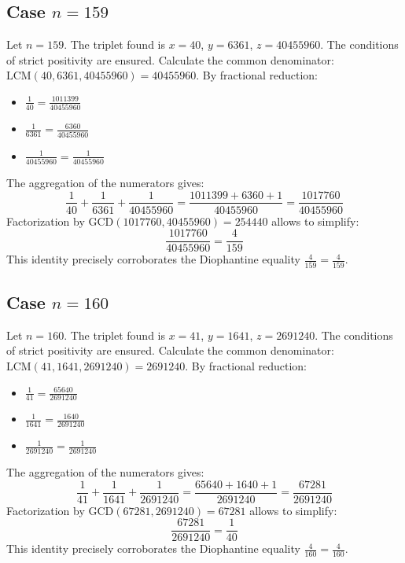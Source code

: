 \documentclass[11pt,a4paper]{article}
\begin{document}
\subsection{Case $n = 159$}
Let $n = 159$. The triplet found is $x = 40$, $y = 6361$, $z = 40455960$.
The conditions of strict positivity are ensured.
Calculate the common denominator: $\text{LCM}(40, 6361, 40455960) = 40455960$.
By fractional reduction:
\begin{itemize}
    \item $\frac{1}{40} = \frac{1011399}{40455960}$
    \item $\frac{1}{6361} = \frac{6360}{40455960}$
    \item $\frac{1}{40455960} = \frac{1}{40455960}$
\end{itemize}
The aggregation of the numerators gives:
$$ \frac{1}{40} + \frac{1}{6361} + \frac{1}{40455960} = \frac{1011399 + 6360 + 1}{40455960} = \frac{1017760}{40455960} $$
Factorization by $\text{GCD}(1017760, 40455960) = 254440$ allows to simplify:
$$ \frac{1017760}{40455960} = \frac{4}{159} $$
This identity precisely corroborates the Diophantine equality $\frac{4}{159} = \frac{4}{159}$.

\subsection{Case $n = 160$}
Let $n = 160$. The triplet found is $x = 41$, $y = 1641$, $z = 2691240$.
The conditions of strict positivity are ensured.
Calculate the common denominator: $\text{LCM}(41, 1641, 2691240) = 2691240$.
By fractional reduction:
\begin{itemize}
    \item $\frac{1}{41} = \frac{65640}{2691240}$
    \item $\frac{1}{1641} = \frac{1640}{2691240}$
    \item $\frac{1}{2691240} = \frac{1}{2691240}$
\end{itemize}
The aggregation of the numerators gives:
$$ \frac{1}{41} + \frac{1}{1641} + \frac{1}{2691240} = \frac{65640 + 1640 + 1}{2691240} = \frac{67281}{2691240} $$
Factorization by $\text{GCD}(67281, 2691240) = 67281$ allows to simplify:
$$ \frac{67281}{2691240} = \frac{1}{40} $$
This identity precisely corroborates the Diophantine equality $\frac{4}{160} = \frac{4}{160}$.
\end{document}
